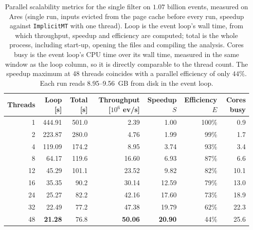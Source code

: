 \begin{table}[htbp]
\centering
\caption{Parallel scalability metrics for the single filter on $1.07$ billion events, measured on Ares (single run, inputs evicted from the page cache before every run, speedup against \texttt{ImplicitMT} with one thread). Loop is the event loop's wall time, from which throughput, speedup and efficiency are computed; total is the whole process, including start-up, opening the files and compiling the analysis. Cores busy is the event loop's CPU time over its wall time, measured in the same window as the loop column, so it is directly comparable to the thread count. The speedup maximum at 48 threads coincides with a parallel efficiency of only $44\%$. Each run reads 8.95--9.56~GB from disk in the event loop.}
\label{tab:scalability-filter}
\setlength{\tabcolsep}{5pt}
\begin{tabular}{rrrrrrr}
\toprule
Threads & Loop [s] & Total [s] & Throughput [$10^6$ ev/s] & Speedup $S$ & Efficiency $E$ & Cores busy \\
\midrule
 1 & 444.91 & 501.0 & 2.39 & 1.00 & 100\% & 0.9 \\
 2 & 223.87 & 280.0 & 4.76 & 1.99 & 99\% & 1.7 \\
 4 & 119.09 & 174.2 & 8.95 & 3.74 & 93\% & 3.4 \\
 8 & 64.17 & 119.6 & 16.60 & 6.93 & 87\% & 6.6 \\
12 & 45.29 & 101.1 & 23.52 & 9.82 & 82\% & 10.1 \\
16 & 35.35 & 90.2 & 30.14 & 12.59 & 79\% & 13.0 \\
24 & 25.27 & 82.2 & 42.16 & 17.60 & 73\% & 18.9 \\
32 & 22.49 & 77.2 & 47.38 & 19.79 & 62\% & 22.3 \\
48 & \textbf{21.28} & 76.8 & \textbf{50.06} & \textbf{20.90} & 44\% & 25.6 \\
\bottomrule
\end{tabular}
\end{table}
